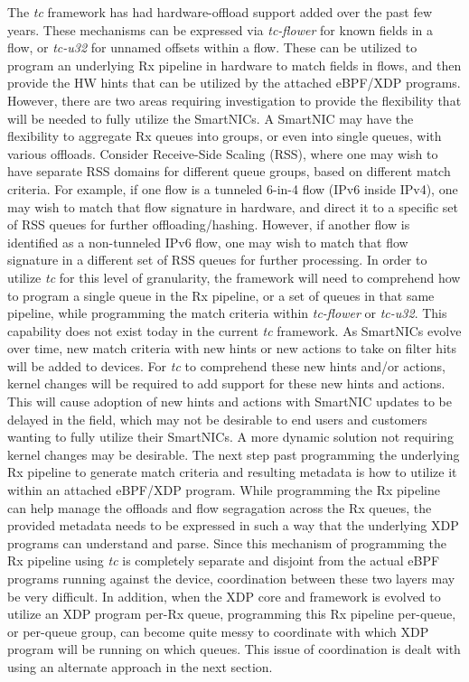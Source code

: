 \documentclass[letterpaper]{article}
\begin{document}
The \textit{tc} framework has had hardware-offload support added over the past few years. These mechanisms can be expressed via \textit{tc-flower} for known fields in a flow, or \textit{tc-u32} for unnamed offsets within a flow. These can be utilized to program an underlying Rx pipeline in hardware to match fields in flows, and then provide the HW hints that can be utilized by the attached eBPF/XDP programs. However, there are two areas requiring investigation to provide the flexibility that will be needed to fully utilize the SmartNICs.
\newline
\indent A SmartNIC may have the flexibility to aggregate Rx queues into groups, or even into single queues, with various offloads. Consider Receive-Side Scaling (RSS), where one may wish to have separate RSS domains for different queue groups, based on different match criteria. For example, if one flow is a tunneled 6-in-4 flow (IPv6 inside IPv4), one may wish to match that flow signature in hardware, and direct it to a specific set of RSS queues for further offloading/hashing. However, if another flow is identified as a non-tunneled IPv6 flow, one may wish to match that flow signature in a different set of RSS queues for further processing. In order to utilize \textit{tc} for this level of granularity, the framework will need to comprehend how to program a single queue in the Rx pipeline, or a set of queues in that same pipeline, while programming the match criteria within \textit{tc-flower} or \textit{tc-u32}. This capability does not exist today in the current \textit{tc} framework.
\newline
\indent As SmartNICs evolve over time, new match criteria with new hints or new actions to take on filter hits will be added to devices. For \textit{tc} to comprehend these new hints and/or actions, kernel changes will be required to add support for these new hints and actions. This will cause adoption of new hints and actions with SmartNIC updates to be delayed in the field, which may not be desirable to end users and customers wanting to fully utilize their SmartNICs. A more dynamic solution not requiring kernel changes may be desirable.
\newline
\indent The next step past programming the underlying Rx pipeline to generate match criteria and resulting metadata is how to utilize it within an attached eBPF/XDP program. While programming the Rx pipeline can help manage the offloads and flow segragation across the Rx queues, the provided metadata needs to be expressed in such a way that the underlying XDP programs can understand and parse. Since this mechanism of programming the Rx pipeline using \textit{tc} is completely separate and disjoint from the actual eBPF programs running against the device, coordination between these two layers may be very difficult. In addition, when the XDP core and framework is evolved to utilize an XDP program per-Rx queue, programming this Rx pipeline per-queue, or per-queue group, can become quite messy to coordinate with which XDP program will be running on which queues. This issue of coordination is dealt with using an alternate approach in the next section.
\end{document}
